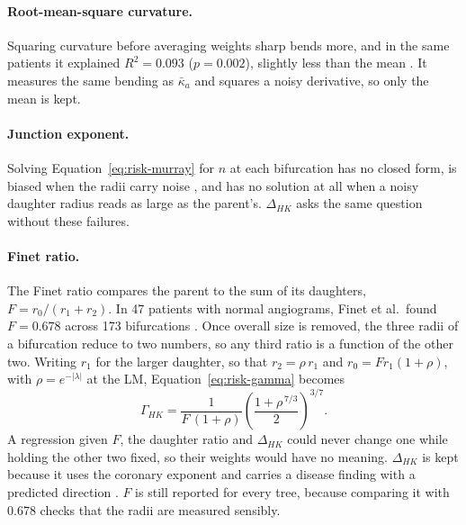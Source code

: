\paragraph{Root-mean-square curvature.}
Squaring curvature before averaging weights sharp bends more, and in the same patients it explained $R^2 = 0.093$ ($p = 0.002$), slightly less than the mean \cite{kashyap2022tortuosity}.
It measures the same bending as $\bar\kappa_a$ and squares a noisy derivative, so only the mean is kept.

\paragraph{Junction exponent.}
Solving Equation~\ref{eq:risk-murray} for $n$ at each bifurcation has no closed form, is biased when the radii carry noise \cite{witt2010optimality}, and has no solution at all when a noisy daughter radius reads as large as the parent's.
$\Delta_{HK}$ asks the same question without these failures.

\paragraph{Finet ratio.}
The Finet ratio compares the parent to the sum of its daughters, $F = r_0/(r_1 + r_2)$.
In 47 patients with normal angiograms, Finet et al.\ found $F = 0.678$ across 173 bifurcations \cite{finet2008fractal}.
Once overall size is removed, the three radii of a bifurcation reduce to two numbers, so any third ratio is a function of the other two.
Writing $r_1$ for the larger daughter, so that $r_2 = \rho\, r_1$ and $r_0 = F r_1 (1 + \rho)$, with $\rho = e^{-\lvert\lambda\rvert}$ at the LM, Equation~\ref{eq:risk-gamma} becomes
\begin{equation}
  \Gamma_{HK} = \frac{1}{F\,(1 + \rho)} \left(\frac{1 + \rho^{\,7/3}}{2}\right)^{3/7}.
  \label{eq:risk-dependence}
\end{equation}
A regression given $F$, the daughter ratio and $\Delta_{HK}$ could never change one while holding the other two fixed, so their weights would have no meaning.
$\Delta_{HK}$ is kept because it uses the coronary exponent and carries a disease finding with a predicted direction \cite{schoenenberger2012murray}.
$F$ is still reported for every tree, because comparing it with 0.678 checks that the radii are measured sensibly.

